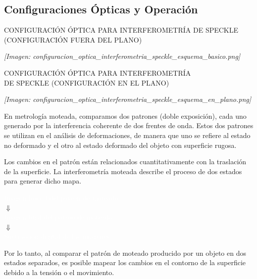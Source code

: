 \documentclass[12pt]{article}
\begin{document}
	\subsection{Configuraciones Ópticas y Operación}
	\begin{center}
		CONFIGURACIÓN ÓPTICA PARA INTERFEROMETRÍA DE SPECKLE \\
		(CONFIGURACIÓN FUERA DEL PLANO)
	\end{center}
	\textit{[Imagen: configuracion\_optica\_interferometria\_speckle\_esquema\_basico.png]}
	
	\begin{center}
		CONFIGURACIÓN ÓPTICA PARA INTERFEROMETRÍA \\
		DE SPECKLE (CONFIGURACIÓN EN EL PLANO)
	\end{center}
	\textit{[Imagen: configuracion\_optica\_interferometria\_speckle\_esquema\_en\_plano.png]}
	
	En metrología moteada, comparamos dos patrones (doble exposición), cada uno generado por la interferencia coherente de dos frentes de onda. Estos dos patrones se utilizan en el análisis de deformaciones, de manera que uno se refiere al estado no deformado y el otro al estado deformado del objeto con superficie rugosa.
	
	\begin{minipage}{0.4\textwidth}
		Los cambios en el patrón están relacionados cuantitativamente con la traslación de la superficie. La interferometría moteada describe el proceso de dos estados para generar dicho mapa.
	\end{minipage}
	\hfill
	\begin{minipage}{0.55\textwidth}
		\begin{center}
			\colorbox{olive!50}{\textcolor{white}{Imagen Inicial del patron de moteado}} \\
			$\Downarrow$ \\
			\colorbox{olive!50}{\textcolor{white}{Imagen final del patron de moteado}} \\
			$\Downarrow$ \\
			\colorbox{olive!50}{\textcolor{white}{Sustracción digital de las imagenes}}
		\end{center}
		
		Por lo tanto, al comparar el patrón de moteado producido por un objeto en dos estados separados, es posible mapear los cambios en el contorno de la superficie debido a la tensión o el movimiento.
	\end{minipage}
	
\end{document}
